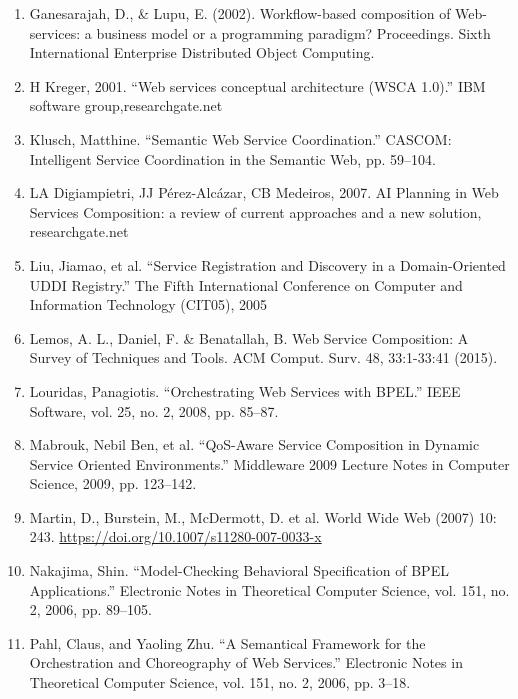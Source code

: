 \documentclass{article}
\begin{document}
\begin{enumerate}
\item Ganesarajah, D., \& Lupu, E. (2002). Workflow-based composition of Web-services: a business model or a programming paradigm? Proceedings. Sixth International Enterprise Distributed Object Computing.

\item H Kreger, 2001. “Web services conceptual architecture (WSCA 1.0).”  IBM software group,researchgate.net

\item Klusch, Matthine. “Semantic Web Service Coordination.” CASCOM: Intelligent Service Coordination in the Semantic Web, pp. 59–104.

\item LA Digiampietri, JJ Pérez-Alcázar, CB Medeiros, 2007. AI Planning in Web Services Composition: a review of current approaches and a new solution, researchgate.net

\item Liu, Jiamao, et al. “Service Registration and Discovery in a Domain-Oriented UDDI Registry.” The Fifth International Conference on Computer and Information Technology (CIT05), 2005

\item Lemos, A. L., Daniel, F. \& Benatallah, B. Web Service Composition: A Survey of Techniques and Tools. ACM Comput. Surv. 48, 33:1-33:41 (2015).

\item Louridas, Panagiotis. “Orchestrating Web Services with BPEL.” IEEE Software, vol. 25, no. 2, 2008, pp. 85–87.

\item Mabrouk, Nebil Ben, et al. “QoS-Aware Service Composition in Dynamic Service Oriented Environments.” Middleware 2009 Lecture Notes in Computer Science, 2009, pp. 123–142.

\item Martin, D., Burstein, M., McDermott, D. et al. World Wide Web (2007) 10: 243. \url{https://doi.org/10.1007/s11280-007-0033-x} 

\item Nakajima, Shin. “Model-Checking Behavioral Specification of BPEL Applications.” Electronic Notes in Theoretical Computer Science, vol. 151, no. 2, 2006, pp. 89–105.

\item Pahl, Claus, and Yaoling Zhu. “A Semantical Framework for the Orchestration and Choreography of Web Services.” Electronic Notes in Theoretical Computer Science, vol. 151, no. 2, 2006, pp. 3–18.


\end{enumerate}
\end{document}

